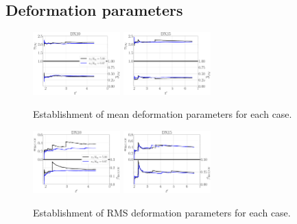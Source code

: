 \clearpage


\subsection*{Deformation parameters}

\begin{figure}[ht]
	\centering
   \includegraphics[width=0.3\textwidth]{./part3_applications/figures_ch8_resolved/SPRAY_characterization/deformation/establishment_DX10_mean}
   \includegraphics[width=0.3\textwidth]{./part3_applications/figures_ch8_resolved/SPRAY_characterization/deformation/establishment_DX15_mean}
   \caption{Establishment of mean deformation parameters for each case.}
\label{fig:app_BIMER_spray_deformation_establishment_mean}
\end{figure}

\vspace*{0.2in}

\begin{figure}[ht]
	\centering
   \includegraphics[width=0.3\textwidth]{./part3_applications/figures_ch8_resolved/SPRAY_characterization/deformation/establishment_DX10_rms}
   \includegraphics[width=0.3\textwidth]{./part3_applications/figures_ch8_resolved/SPRAY_characterization/deformation/establishment_DX15_rms}
   \caption{Establishment of RMS deformation parameters for each case.}
\label{fig:app_BIMER_spray_deformation_establishment_rms}
\end{figure}

